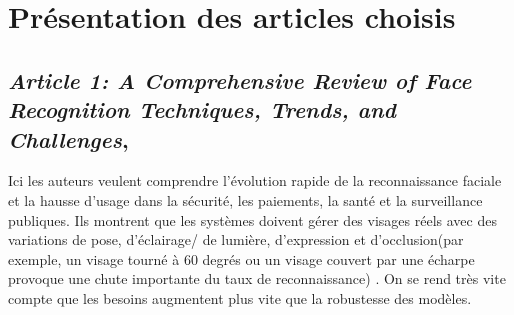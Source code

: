 \documentclass[11pt]{article}
\begin{document}
\section{Présentation des articles choisis}

\subsection{\textit{Article 1: A Comprehensive Review of Face Recognition Techniques, Trends, and Challenges}, }

Ici les auteurs veulent comprendre l’évolution rapide de la reconnaissance faciale et la hausse  d’usage dans la sécurité, les 
paiements, la santé et la surveillance publiques. Ils  montrent que les systèmes doivent gérer des visages réels avec des 
variations de pose, d’éclairage/ de lumière, d’expression et d’occlusion(par exemple, un visage tourné à 60 degrés ou un visage 
couvert par une écharpe provoque une chute importante du taux de reconnaissance) . On se rend très vite compte que les besoins 
augmentent plus vite que la robustesse des modèles.
\end{document}
